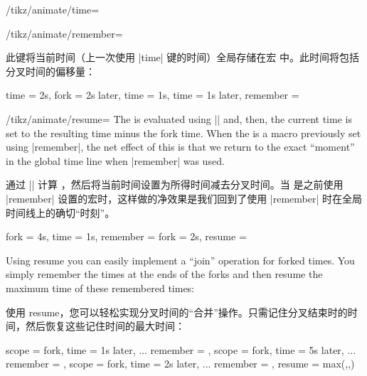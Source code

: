 \begin{key}{/tikz/animate/time=}
\begin{key}{/tikz/animate/remember=}
        
        此键将当前时间（上一次使用 |time| 键的时间）全局存储在宏  中。此时间将包括分叉时间的偏移量：


\begin{codeexample}
time = 2s,
fork = 2s later,    %
time = 1s,          %
time = 1s later,    %
remember = \mytime  %
\end{codeexample}
    \end{key}
    \begin{key}{/tikz/animate/resume=}
        The  is evaluated using |\pgfparsetime| and, then,
        the current time is set to the resulting time minus the fork time. When
        the  is a macro previously set using |remember|,
        the net effect of this is that we return to the exact ``moment'' in the
        global time line when |remember| was used.
        
        通过 |\pgfparsetime| 计算 ，然后将当前时间设置为所得时间减去分叉时间。当  是之前使用 |remember| 设置的宏时，这样做的净效果是我们回到了使用 |remember| 时在全局时间线上的确切“时刻”。


\begin{codeexample}
fork = 4s,
time = 1s,
remember = \mytime  %
fork = 2s,          %
resume   = \mytime  %
\end{codeexample}
        Using resume you can easily implement a ``join'' operation for forked
        times. You simply remember the times at the ends of the forks and then
        resume the maximum time of these remembered times:
        
        使用 resume，您可以轻松实现分叉时间的“合并”操作。只需记住分叉结束时的时间，然后恢复这些记住时间的最大时间：
\begin{codeexample}
scope = {
  fork,
  time = 1s later,
  ...
  remember = \forka
},
scope = {
  fork,
  time = 5s later,
  ...
  remember = \forkb
},
scope = {
  fork,
  time = 2s later,
  ...
  remember = \forkc
},
resume = {max(\forka,\forkb,\forkc)} %
\end{codeexample}
    \end{key}
\end{key}


